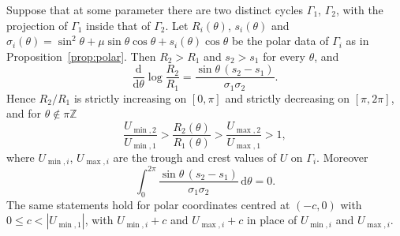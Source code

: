 \begin{proposition}\label{prop:nestedradii}
Suppose that at some parameter there are two distinct cycles $\Gamma_1$, $\Gamma_2$, with the projection of $\Gamma_1$ inside that of $\Gamma_2$. Let $R_i(\theta)$, $s_i(\theta)$ and $\sigma_i(\theta)=\sin^2\theta+\mu\sin\theta\cos\theta+s_i(\theta)\cos\theta$ be the polar data of $\Gamma_i$ as in Proposition~\ref{prop:polar}. Then $R_2>R_1$ and $s_2>s_1$ for every $\theta$, and
\begin{equation}\label{gau:radialratio}
\frac{\mathrm d}{\mathrm d\theta}\log\frac{R_2}{R_1}=\frac{\sin\theta\,(s_2-s_1)}{\sigma_1\sigma_2}.
\end{equation}
Hence $R_2/R_1$ is strictly increasing on $[0,\pi]$ and strictly decreasing on $[\pi,2\pi]$, and for $\theta\notin\pi\mathbb Z$
\begin{equation}\label{gau:ratiochain}
\frac{U_{\min,2}}{U_{\min,1}}>\frac{R_2(\theta)}{R_1(\theta)}>\frac{U_{\max,2}}{U_{\max,1}}>1 ,
\end{equation}
where $U_{\min,i}$, $U_{\max,i}$ are the trough and crest values of $U$ on $\Gamma_i$. Moreover
\[
\int_0^{2\pi}\frac{\sin\theta\,(s_2-s_1)}{\sigma_1\sigma_2}\,\mathrm d\theta=0 .
\]
The same statements hold for polar coordinates centred at $(-c,0)$ with $0\le c<|U_{\min,1}|$, with $U_{\min,i}+c$ and $U_{\max,i}+c$ in place of $U_{\min,i}$ and $U_{\max,i}$.
\end{proposition}
